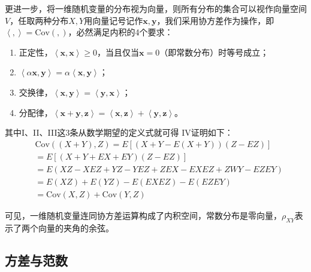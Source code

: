 更进一步，将一维随机变量的分布视为向量，则所有分布的集合可以视作向量空间$V$，任取两种分布$X,Y$用向量记号记作$\boldsymbol{x},\boldsymbol{y}$，我们采用协方差作为操作，即$\left< , \right> =\mathrm{Cov}\left( , \right) $，必然满足内积的4个要求：
\begin{enumerate}[label=\Roman*.]
    \item 正定性，$\left< \boldsymbol{x},\boldsymbol{x} \right> \geqslant 0$，当且仅当$\boldsymbol{x} =0$（即常数分布）时等号成立；
    \item $\left< \alpha \boldsymbol{x},\boldsymbol{y} \right> =\alpha \left< \boldsymbol{x},\boldsymbol{y} \right> $；
    \item 交换律，$\left< \boldsymbol{x},\boldsymbol{y} \right> =\left< \boldsymbol{y},\boldsymbol{x} \right> $；
    \item 分配律，$\left< \boldsymbol{x}+\boldsymbol{y},\boldsymbol{z} \right> =\left< \boldsymbol{x},\boldsymbol{z} \right> +\left< \boldsymbol{y},\boldsymbol{z} \right> $。
\end{enumerate}
其中I、II、III这3条从数学期望的定义式就可得
IV证明如下：
\begin{align*}
&\mathrm{Cov}\left( \left( X+Y \right) ,Z \right) =E\left[ \left( X+Y-E\left( X+Y \right) \right) \left( Z-EZ \right) \right] \\
&=E\left[ \left( X+Y+EX+EY \right) \left( Z-EZ \right) \right] \\
&=E\left( XZ-XEZ+YZ-YEZ+ZEX-EXEZ+ZWY-EZEY \right) \\
&=E\left( XZ \right) +E\left( YZ \right) -E\left( EXEZ \right) -E\left( EZEY \right) \\
&=\mathrm{Cov}\left( X,Z \right) +\mathrm{Cov}\left( Y,Z \right)
\end{align*}

\begin{tcolorbox}
可见，一维随机变量连同协方差运算构成了内积空间，常数分布是零向量，$\rho _{XY}$表示了两个向量的夹角的余弦。
\end{tcolorbox}

\subsection{方差与范数}

